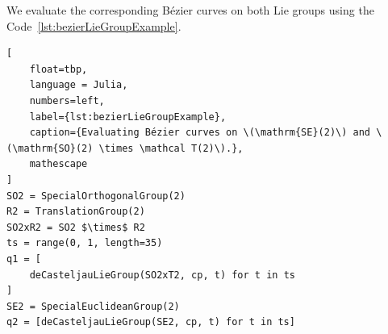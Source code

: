 \documentclass{juliacon}
\begin{document}
We evaluate the corresponding Bézier curves on both Lie groups using the Code~\ref{lst:bezierLieGroupExample}.
\begin{lstlisting}[
    float=tbp,
    language = Julia,
    numbers=left,
    label={lst:bezierLieGroupExample},
    caption={Evaluating Bézier curves on \(\mathrm{SE}(2)\) and \(\mathrm{SO}(2) \times \mathcal T(2)\).},
    mathescape
]
SO2 = SpecialOrthogonalGroup(2)
R2 = TranslationGroup(2)
SO2xR2 = SO2 $\times$ R2
ts = range(0, 1, length=35)
q1 = [
    deCasteljauLieGroup(SO2xT2, cp, t) for t in ts
]
SE2 = SpecialEuclideanGroup(2)
q2 = [deCasteljauLieGroup(SE2, cp, t) for t in ts]
\end{lstlisting}

\begin{figure}[tbp]
    \def\arrowscale{0.15}


\end{figure}
\end{document}
